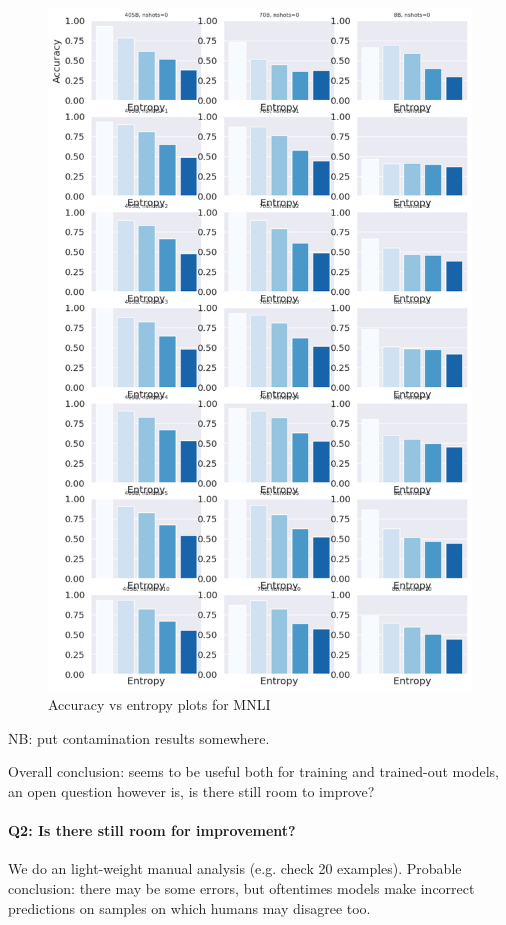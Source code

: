 \begin{figure}
    \centering
    \includegraphics[width=0.9\linewidth]{figures/mnli_matched_entropy_acc.png}
    \caption{Accuracy vs entropy plots for MNLI}
    \label{fig:entropy_accuracy_mnli}
\end{figure}

NB: put contamination results somewhere.

Overall conclusion: seems to be useful both for training and trained-out models, an open question however is, is there still room to improve?

\paragraph{Q2: Is there still room for improvement?}
We do an light-weight manual analysis (e.g. check 20 examples).
Probable conclusion: there may be some errors, but oftentimes models make incorrect predictions on samples on which humans may disagree too.

